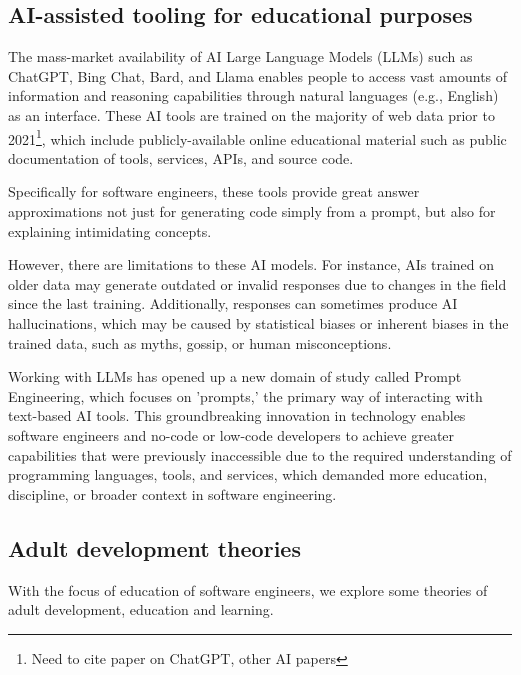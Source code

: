 \documentclass[journal, onecolumn]{IEEEtran}
\newcommand{\tomegg}{
  \href{http://tome.gg}{Tome.gg}
}
\begin{document}
\subsection{AI-assisted tooling for educational purposes}
The mass-market availability of AI Large Language Models (LLMs) such as ChatGPT, 
Bing Chat, Bard, and Llama enables people to access vast amounts of information 
and reasoning capabilities through natural languages (e.g., English) as an 
interface. These AI tools are trained on the majority of web data prior to 
2021\footnote{Need to cite paper on ChatGPT, other AI papers}, which include
publicly-available online educational material such as public documentation of
tools, services, APIs, and source code. 

Specifically for software engineers, these tools provide great answer 
approximations not just for generating code simply from a prompt, but also for 
explaining intimidating concepts. 

However, there are limitations to these AI models. For instance, AIs trained on 
older data may generate outdated or invalid responses due to changes in the field 
since the last training. Additionally, responses can sometimes produce AI 
hallucinations, which may be caused by statistical biases or inherent biases in 
the trained data, such as myths, gossip, or human misconceptions.

Working with LLMs has opened up a new domain of study called Prompt Engineering, 
which focuses on 'prompts,' the primary way of interacting with text-based AI 
tools. This groundbreaking innovation in technology enables software engineers 
and no-code or low-code developers to achieve greater capabilities that were 
previously inaccessible due to the required understanding of programming 
languages, tools, and services, which demanded more education, discipline, or 
broader context in software engineering.
\subsection{Adult development theories}

With the focus of education of software engineers, we explore some theories of 
adult development, education and learning.

\end{document}
